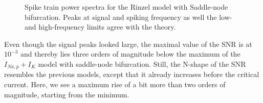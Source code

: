 \documentclass[12pt,a4paper]{article}
\begin{document}
\begin{figure}[H]
	\label{rinzelspec}
	\hspace*{-0.5cm}
	\caption{Spike train power spectra for the Rinzel model with Saddle-node bifurcation. Peaks at signal and spiking frequency as well the low- and high-frequency limits agree with the theory.}
\end{figure}
Even though the signal peaks looked large, the maximal value of the SNR is at $10^{-3}$ and thereby lies three orders of magnitude below the maximum of the $I_{Na,p}+I_K$ model with saddle-node bifurcation. Still, the N-shape of the SNR resembles the previous models, except that it already increases before the critical current. Here, we see a maximum rise of a bit more than two orders of magnitude, starting from the minimum.
\end{document}
